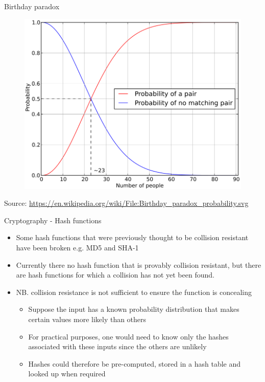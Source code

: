 \documentclass[11pt]{beamer}
\begin{document}

\begin{frame}{Birthday paradox}
	\begin{figure}[]
		\centering
		\includegraphics  [scale=0.2]{Images/paradox}
	\end{figure}
	\begin{tiny}
		Source: \href{https://en.wikipedia.org/wiki/File:Birthday_paradox_probability.svg}{https://en.wikipedia.org/wiki/File:Birthday\_paradox\_probability.svg}
	\end{tiny}
\end{frame}


\begin{frame}{Cryptography - Hash functions}
	\begin{itemize}
		\item Some hash functions that were previously thought to be collision resistant have been broken e.g. MD5 and SHA-1
		\item Currently there no hash function that is provably collision resistant, but there are hash functions for which a collision has not yet been found.
		\item NB. collision resistance is not sufficient to ensure the function is concealing
		\begin{itemize}
			\item Suppose the input has a known probability distribution that makes certain values more likely than others
			\item For practical purposes, one would need to know only the hashes associated with these inputs since the others are unlikely
			\item Hashes could therefore be pre-computed, stored in a hash table and looked up when required
		\end{itemize}
	\end{itemize}
\end{frame}
\end{document}

